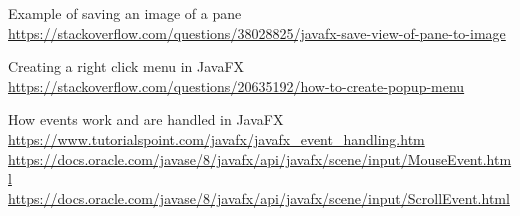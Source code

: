 \documentclass[../../main.tex]{subfiles}
\begin{document}
\begin{thebibliography}{9}
Example of saving an image of a pane\\
\url{https://stackoverflow.com/questions/38028825/javafx-save-view-of-pane-to-image}

Creating a right click menu in JavaFX\\
\url{https://stackoverflow.com/questions/20635192/how-to-create-popup-menu}

How events work and are handled in JavaFX\\
\url{https://www.tutorialspoint.com/javafx/javafx_event_handling.htm}\\
\url{https://docs.oracle.com/javase/8/javafx/api/javafx/scene/input/MouseEvent.html}\\
\url{https://docs.oracle.com/javase/8/javafx/api/javafx/scene/input/ScrollEvent.html}
\end{thebibliography}
\end{document}
